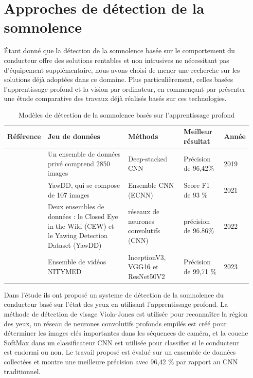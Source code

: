 \section{Approches de détection de la somnolence}

Étant donné que la détection de la somnolence basée sur le comportement du conducteur offre des solutions rentables et non intrusives ne nécessitant pas d'équipement supplémentaire, nous avons choisi de mener une recherche sur les solutions déjà adoptées dans ce domaine. Plus particulièrement, celles basées l'apprentissage profond et la vision par ordinateur, en commençant par présenter une étude comparative des travaux déjà réalisés basés sur ces technologies.\\
\begin{table}[htbp]
    \centering
    \begin{tabularx}{\textwidth}{|X|X|X|X|X|}
    \hline
       \textbf{Référence}  & \textbf{Jeu de données} & \textbf{Méthods}&\textbf{Meilleur résultat}& \textbf{Année}\\ \hline
       \cite{chirra2019deep} &Un ensemble de données privé comprend 2850 images & Deep-stacked CNN& Précision de 96,42\% & 2019 \\ \hline
      
        \cite{salman2021driver}&YawDD, qui se compose de 107 images & Ensemble CNN (ECNN) & Score F1 de 93 \%  & 2021\\ \hline
        \cite{rajkar2022driver} & Deux ensembles de données : le Closed Eye in the Wild (CEW) et le Yawing Detection Dataset (YawDD)& réseaux de neurones convolutifs (CNN) & précision de 96.86\% & 2022 \\ \hline
       \cite{Florez2023ACA}  &Ensemble de vidéos NITYMED & InceptionV3, VGG16 et ResNet50V2 &  Précision de 99,71 \% & 2023  \\ \hline
  
    \end{tabularx}
    \caption{Modèles de détection de la somnolence basés sur l'apprentissage profond }
    
    \label{tab:my_label}
\end{table}
\newpage
Dans l'étude \textbf{\cite{chirra2019deep}} ils ont proposé un systeme de détection de la somnolence du conducteur basé sur  l'état des yeux en utilisant l'apprentissage profond. La méthode de détection de visage Viola-Jones est utilisée pour reconnaître la région des yeux, un réseau de neurones convolutifs profonds empilés est créé pour déterminer les images clés importantes dans les séquences de caméra, et la couche SoftMax dans un classificateur CNN est utilisée pour classifier si le conducteur est endormi ou non.  Le travail proposé est évalué sur un ensemble de données collectées et montre une meilleure précision avec 96,42 \% par rapport au CNN traditionnel.\\ \\



